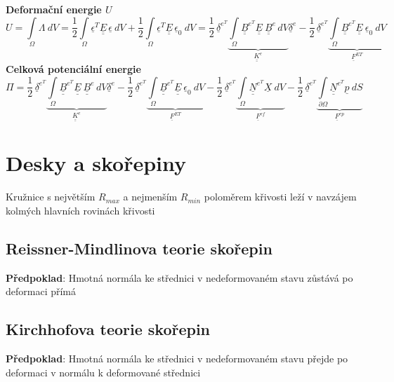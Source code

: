 \documentclass[10pt,oneside]{article}
\newcommand{\ul}[1]{\underline{#1}}
\newcommand{\ull}[1]{\underline{\underline{#1}}}
\begin{document}
\textbf{Deformační energie $U$}
\begin{equation*}
U = \int\limits_\Omega \Lambda \ dV
	= \frac{1}{2} \int\limits_\Omega \ul{\epsilon}^T \ull{E}\,\ul{\epsilon} \ dV
	+ \frac{1}{2} \int\limits_\Omega \ul{\epsilon}^T \ull{E}\,\ul{\epsilon}_0 \ dV
	= \frac{1}{2}\,\ul{\delta}^{e^T}\!\underbrace{\int\limits_\Omega \ull{B}^{e^T}\!\ull{E}\ \ull{B}^e\,dV}_{\ull{K}^e} \ul{\delta}^e
	- \frac{1}{2}\,\ul{\delta}^{e^T}\!\underbrace{\int\limits_\Omega \ull{B}^{e^T}\!\ull{E}\ \ul{\epsilon}_0 \ dV}_{\ul{F}^{ET}}
\end{equation*}
%
%
\textbf{Celková potenciální energie}
\begin{equation*}
	\Pi = \frac{1}{2}\,\ul{\delta}^{e^T}\!\underbrace{\int\limits_\Omega \ull{B}^{e^T}\!\ull{E}\ \ull{B}^e\,dV}_{\ull{K}^e} \ul{\delta}^e
		- \frac{1}{2}\,\ul{\delta}^{e^T}\!\underbrace{\int\limits_\Omega \ull{B}^{e^T}\!\ull{E}\ \ul{\epsilon}_0 \ dV}_{\ul{F}^{ET}}
		- \frac{1}{2}\,\ul{\delta}^{e^T}\!\underbrace{\int\limits_\Omega \ull{N}^{e^T}\!\ul{X} \ dV}_{\ul{F}^{ef}}
		- \frac{1}{2}\,\ul{\delta}^{e^T}\!\underbrace{\int\limits_{\partial\Omega} \ull{N}^{e^T}\!\ul{p} \ dS}_{\ul{F}^{ep}}
\end{equation*}

\newpage
\section*{Desky a skořepiny}

Kružnice s největším $R_{max}$ a nejmenším $R_{min}$ poloměrem křivosti leží v navzájem kolmých hlavních rovinách křivosti

\subsection*{Reissner-Mindlinova teorie skořepin}
%
\textbf{Předpoklad}: Hmotná normála ke střednici v nedeformovaném stavu zůstává po deformaci přímá

\subsection*{Kirchhofova teorie skořepin}
%
\textbf{Předpoklad}: Hmotná normála ke střednici v nedeformovaném stavu přejde po deformaci v normálu k deformované střednici
\end{document}
